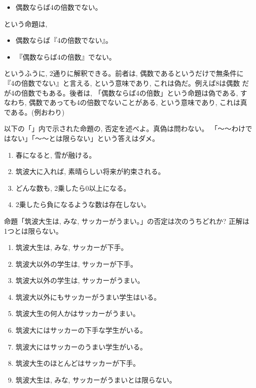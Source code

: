 \begin{exmpl}
\begin{itemize}
\item 偶数ならば4の倍数でない。
\end{itemize}
という命題は, 
\begin{itemize}
\item 偶数ならば『4の倍数でない』。
\item 『偶数ならば4の倍数』でない。
\end{itemize}
というふうに, 2通りに解釈できる。前者は, 偶数であるというだけで無条件に
『4の倍数でない』と言える, という意味であり, これは偽だ。例えば8は偶数
だが4の倍数でもある。後者は, 「偶数ならば4の倍数」という命題は偽である, 
すなわち, 偶数であっても4の倍数でないことがある, という意味であり, 
これは真である。(例おわり)\end{exmpl}
\mv



\begin{q}\label{q:logic_hitei0} 以下の「」内で示された命題の, 
否定を述べよ。真偽は問わない。
「〜〜わけではない」「〜〜とは限らない」という答えはダメ。
\begin{enumerate}
\item 春になると, 雪が融ける。
\item 筑波大に入れば, 素晴らしい将来が約束される。
\item どんな数も, 2乗したら0以上になる。
\item 2乗したら負になるような数は存在しない。
\end{enumerate}
\end{q}
\mv


\begin{q}\label{q:logic_soccer0}
命題「筑波大生は, みな, サッカーがうまい。」の否定は次のうちどれか? 正解は1つとは限らない。
\begin{enumerate}
\item 筑波大生は, みな, サッカーが下手。
\item 筑波大以外の学生は, サッカーが下手。
\item 筑波大以外の学生は, サッカーがうまい。
\item 筑波大以外にもサッカーがうまい学生はいる。
\item 筑波大生の何人かはサッカーがうまい。
\item 筑波大にはサッカーの下手な学生がいる。
\item 筑波大にはサッカーのうまい学生がいる。
\item 筑波大生のほとんどはサッカーが下手。
\item 筑波大生は, みな, サッカーがうまいとは限らない。
\end{enumerate}
\end{q}
\mv



